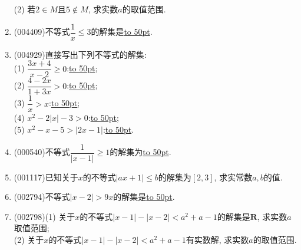 \documentclass[10pt,a4paper]{article}
\newcommand{\blank}[1]{\underline{\hbox to #1pt{}}}
\begin{document}
\begin{enumerate}[1.]
(2) 若$2\in M$且$5\notin M$, 求实数$a$的取值范围.
\item {\tiny (004409)}不等式$\dfrac 1x\le 3$的解集是\blank{50}.
\item {\tiny (004929)}直接写出下列不等式的解集:\\
(1) $\dfrac{3x+4}{x-2}\ge 0$:\blank{50};\\
(2) $\dfrac{4-2x}{1+3x}>0$:\blank{50};\\
(3) $\dfrac 1x>x$:\blank{50};\\	
(4) $x^2-2|x|-3>0$:\blank{50};\\
(5) $x^2-x-5>|2x-1|$:\blank{50}.
\item {\tiny (000540)}不等式$\dfrac1{|x-1|}\ge 1 $的解集为\blank{50}.
\item {\tiny (001117)}已知关于$x$的不等式$|ax+1|\leq b$的解集为$[2,3]$, 求实常数$a,b$的值.
\item {\tiny (002794)}不等式$|x-2|>9x$的解集是\blank{50}.
\item {\tiny (002798)}(1) 关于$x$的不等式$|x-1|-|x-2|<a^2+a-1$的解集是$\mathbf{R}$, 求实数$a$取值范围;\\
(2) 关于$x$的不等式$|x-1|-|x-2|<a^2+a-1$有实数解, 求实数$a$的取值范围.



\end{enumerate}
\end{document}

